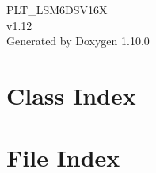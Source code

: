\documentclass[twoside]{book}
\newcommand{\+}{\discretionary{\mbox{\scriptsize$\hookleftarrow$}}{}{}}
\newcommand{\clearemptydoublepage}{%
    \newpage{\pagestyle{empty}\cleardoublepage}%
  }
\begin{document}
  \raggedbottom
    \hypersetup{pageanchor=false,
                bookmarksnumbered=true,
                pdfencoding=unicode
               }
  \begin{titlepage}
  \vspace*{7cm}
  \begin{center}%
  {\Large PLT\+\_\+\+LSM6\+DSV16X}\\
  [1ex]\large v1.\+12 \\
  \vspace*{1cm}
  {\large Generated by Doxygen 1.10.0}\\
  \end{center}
  \end{titlepage}
  \clearemptydoublepage
  \tableofcontents
  \clearemptydoublepage
  \hypersetup{pageanchor=true}

\chapter{Class Index}

\chapter{File Index}

\end{document}
